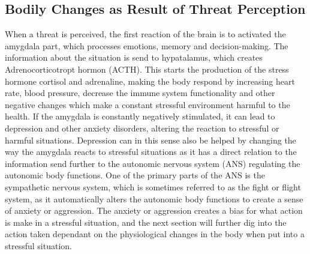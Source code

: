 \subsection{Bodily Changes as Result of Threat Perception}
When a threat is perceived, the first reaction of the brain is to activated the amygdala part, which processes emotions, memory and decision-making. The information about the situation is send to hypatalamus, which creates Adrenocorticotropt hormon (ACTH). This starts the production of the stress hormone cortisol and adrenaline, making the body respond by increasing heart rate, blood pressure, decrease the immune system functionality and other negative changes which make a constant stressful environment harmful to the health. If the amygdala is constantly negatively stimulated, it can lead to depression and other anxiety disorders, altering the reaction to stressful or harmful situations. Depression can in this sense also be helped by changing the way the amygdala reacts to stressful situations as it has a direct relation to the information send further to the autonomic nervous system (ANS) regulating the autonomic body functions. One of the primary parts of the ANS is the sympathetic nervous system, which is sometimes referred to as the fight or flight system, as it automatically alters the autonomic body functions to create a sense of anxiety or aggression. The anxiety or aggression creates a bias for what action is make in a stressful situation, and the next section will further dig into the action taken dependant on the physiological changes in the body when put into a stressful situation.\cite{human_physiology} \cite{perspective_anxiety} \cite{CNS}
